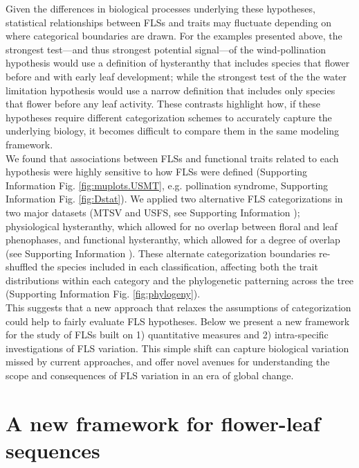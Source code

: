 \documentclass[11pt]{article}
\begin{document}
\noindent Given the differences in biological processes underlying these hypotheses, statistical relationships between FLSs and traits may fluctuate depending on where categorical boundaries are drawn. For the examples presented above, the strongest test---and thus strongest potential signal---of the wind-pollination hypothesis would use a definition of hysteranthy that includes species that flower before and with early leaf development; while the strongest test of the the water limitation  hypothesis would use a narrow definition that includes only species that flower before any leaf activity. These contrasts highlight how, if these hypotheses require different categorization schemes to accurately capture the underlying biology, it becomes difficult to compare them in the same modeling framework.\\ %

\noindent We found that associations between FLSs and functional traits related to each hypothesis were highly sensitive to how FLSs were defined (Supporting Information Fig. \ref{fig:muplots.USMT}, e.g. pollination syndrome, Supporting Information Fig. \ref{fig:Dstat}). We applied two alternative FLS categorizations in two major datasets (MTSV and USFS, see Supporting Information ); physiological hysteranthy, which allowed for no overlap between floral and leaf phenophases, and functional hysteranthy, which allowed for a degree of overlap (see Supporting Information ). These alternate categorization boundaries re-shuffled the species included in each classification, affecting both the trait distributions within each category and the phylogenetic patterning across the tree (Supporting Information Fig. \ref{fig:phylogeny}).\\ 
 
\noindent This suggests that a new approach that relaxes the assumptions of categorization could help to fairly evaluate FLS hypotheses. Below we present a new framework for the study of FLSs built on 1) quantitative measures and 2) intra-specific investigations of FLS variation. This simple shift can capture biological variation missed by current approaches, and offer novel avenues for understanding the scope and consequences of FLS variation in an era of global change.

 
\section*{A new framework for flower-leaf sequences} 
\end{document}
